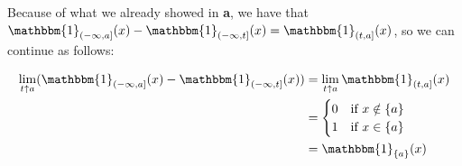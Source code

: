 \documentclass[12pt]{article}
\begin{document}
\begin{enumerate}[label=\textbf{\alph*.   }]
Because of what we already showed in \textbf{a}, we have that $ \mathbbm{1}_{(-\infty,a]}(x)-\mathbbm{1}_{(-\infty,t]}(x)=\mathbbm{1}_{(t,a]}(x) $, so we can continue as follows:

\begin{align*}
    \lim_{t \uparrow a}(\mathbbm{1}_{(-\infty,a]}(x)-\mathbbm{1}_{(-\infty,t]}(x))&=\lim_{t \uparrow a}\mathbbm{1}_{(t,a]}(x)\\
    &=\begin{cases}
        0 & \text{if } x\notin \{a\}\\
        1 & \text{if } x\in \{a\}
    \end{cases}\\
    &=\mathbbm{1}_{\{a\}}(x)
\end{align*}


\end{enumerate} 

    
\end{document}
